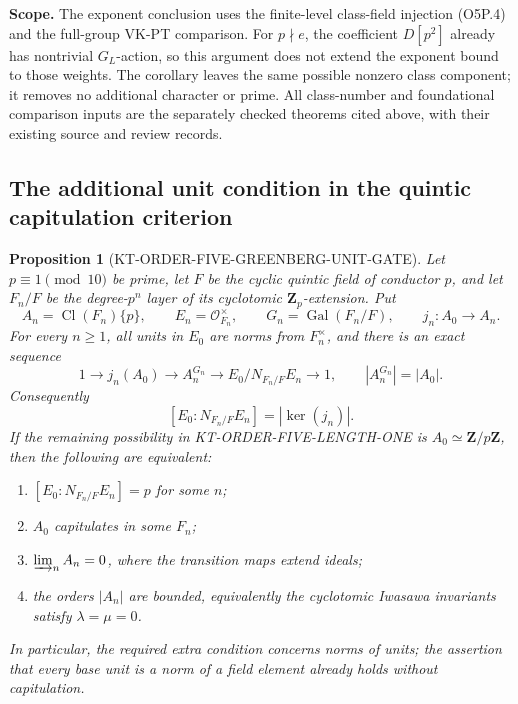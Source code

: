 \documentclass[11pt,a4paper]{article}
\newtheorem{proposition}[theorem]{Proposition}
\theoremstyle{definition}
\renewcommand{\paragraph}[1]{\par\smallskip\noindent\textbf{#1}\quad\ignorespaces}
\begin{document}
\paragraph{Scope.}
The exponent conclusion uses the finite-level class-field injection
(O5P.4) and the full-group VK-PT comparison.
For $p\nmid e$, the coefficient $D[p^2]$ already has nontrivial
$G_L$-action, so this argument does not extend the exponent bound
to those weights.  The corollary leaves the same possible nonzero
class component; it removes no additional character or prime.
All class-number and foundational comparison inputs are the
separately checked theorems cited above, with their existing
source and review records.



\subsection{The additional unit condition in the quintic capitulation criterion}

\begin{proposition}[KT-ORDER-FIVE-GREENBERG-UNIT-GATE]
Let $p\equiv1\pmod {10}$ be prime, let $F$ be the cyclic quintic
field of conductor $p$, and let $F_n/F$ be the degree-$p^n$ layer
of its cyclotomic $\mathbf Z_p$-extension.  Put
\[
 A_n=\operatorname{Cl}(F_n)\{p\},\qquad
 E_n=\mathcal O_{F_n}^{\times},\qquad
 G_n=\operatorname{Gal}(F_n/F),
 \qquad j_n:A_0\longrightarrow A_n.
                                                        \tag{O5G.1}
\]
For every $n\ge1$, all units in $E_0$ are norms from
$F_n^{\times}$, and there is an exact sequence
\[
 1\longrightarrow j_n(A_0)\longrightarrow A_n^{G_n}
 \longrightarrow E_0/N_{F_n/F}E_n\longrightarrow1,
 \qquad |A_n^{G_n}|=|A_0|.                              \tag{O5G.2}
\]
Consequently
\[
 [E_0:N_{F_n/F}E_n]=|\ker(j_n)|.                        \tag{O5G.3}
\]
If the remaining possibility in KT-ORDER-FIVE-LENGTH-ONE is
$A_0\simeq\mathbf Z/p\mathbf Z$, then the following are equivalent:
\begin{enumerate}
\item $[E_0:N_{F_n/F}E_n]=p$ for some $n$;
\item $A_0$ capitulates in some $F_n$;
\item $\varinjlim_n A_n=0$, where the transition maps extend ideals;
\item the orders $|A_n|$ are bounded, equivalently the cyclotomic
      Iwasawa invariants satisfy $\lambda=\mu=0$.
\end{enumerate}
In particular, the required extra condition concerns norms of
\emph{units}; the assertion that every base unit is a norm of a
field element already holds without capitulation.
\end{proposition}
\end{document}

